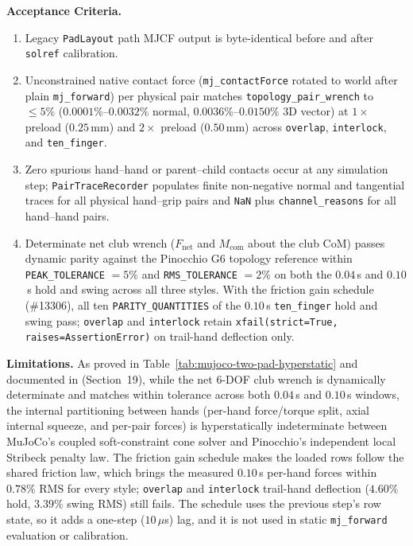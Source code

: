 \documentclass[11pt,a4paper]{article}
\begin{document}
\textbf{Acceptance Criteria.}
\begin{enumerate}[leftmargin=*,noitemsep]
\item Legacy \texttt{PadLayout} path MJCF output is byte-identical before and after \texttt{solref} calibration.
\item Unconstrained native contact force (\texttt{mj\_contactForce} rotated to world after plain \texttt{mj\_forward}) per physical pair matches \texttt{topology\_pair\_wrench} to $\le 5\%$ ($0.0001\%$--$0.0032\%$ normal, $0.0036\%$--$0.0150\%$ 3D vector) at $1\times$ preload ($0.25$\,mm) and $2\times$ preload ($0.50$\,mm) across \texttt{overlap}, \texttt{interlock}, and \texttt{ten\_finger}.
\item Zero spurious hand--hand or parent--child contacts occur at any simulation step; \texttt{PairTraceRecorder} populates finite non-negative normal and tangential traces for all physical hand--grip pairs and \texttt{NaN} plus \texttt{channel\_reasons} for all hand--hand pairs.
\item Determinate net club wrench ($F_{\mathrm{net}}$ and $M_{\mathrm{com}}$ about the club CoM) passes dynamic parity against the Pinocchio G6 topology reference within \texttt{PEAK\_TOLERANCE} $= 5\%$ and \texttt{RMS\_TOLERANCE} $= 2\%$ on both the $0.04$\,s and $0.10$\,s hold and swing across all three styles. With the friction gain schedule (\#13306), all ten \texttt{PARITY\_QUANTITIES} of the $0.10$\,s \texttt{ten\_finger} hold and swing pass; \texttt{overlap} and \texttt{interlock} retain \texttt{xfail(strict=True, raises=AssertionError)} on trail-hand deflection only.
\end{enumerate}

\textbf{Limitations.} As proved in Table~\ref{tab:mujoco-two-pad-hyperstatic} and documented in  (Section~19), while the net 6-DOF club wrench is dynamically determinate and matches within tolerance across both $0.04$\,s and $0.10$\,s windows, the internal partitioning between hands (per-hand force/torque split, axial internal squeeze, and per-pair forces) is hyperstatically indeterminate between MuJoCo's coupled soft-constraint cone solver and Pinocchio's independent local Stribeck penalty law. The friction gain schedule makes the loaded rows follow the shared friction law, which brings the measured $0.10$\,s per-hand forces within $0.78\%$ RMS for every style; \texttt{overlap} and \texttt{interlock} trail-hand deflection ($4.60\%$ hold, $3.39\%$ swing RMS) still fails. The schedule uses the previous step's row state, so it adds a one-step ($10\,\mu$s) lag, and it is not used in static \texttt{mj\_forward} evaluation or calibration.
\end{document}
